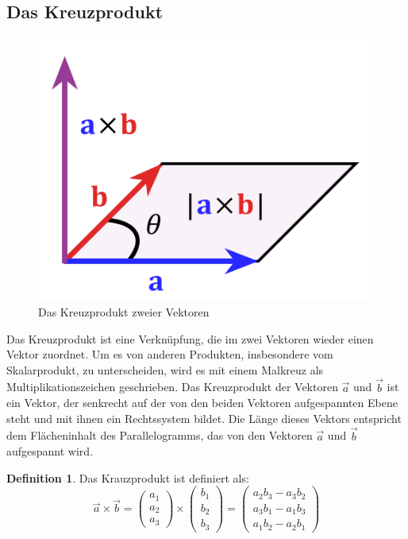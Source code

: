 \documentclass[a4paper,10pt,DIV9, BCOR12mm, oneside,openright,openbib]{scrreprt}
\theoremstyle{definition}
\newtheorem{mydef}{Definition}[section]
\theoremstyle{plain}
\begin{document}
\newpage
\subsection{Das Kreuzprodukt}\label{subsec:Kreuzprd}
\begin{figure}
 \centering
 \includegraphics[scale=0.4,keepaspectratio=true]{./Bilder/480px-Cross_product_parallelogram.png}
 \caption{Das Kreuzprodukt zweier Vektoren}
 \label{fig:Kreuzprd}
\end{figure}

Das Kreuzprodukt ist eine Verknüpfung, die im zwei Vektoren wieder einen Vektor zuordnet. Um es von anderen Produkten, insbesondere vom Skalarprodukt, zu unterscheiden, wird es mit einem Malkreuz als Multiplikationszeichen geschrieben.
Das Kreuzprodukt der Vektoren $\vec a$ und $\vec b$ ist ein Vektor, der senkrecht auf der von den beiden Vektoren aufgespannten Ebene steht und mit ihnen ein Rechtssystem bildet. Die Länge dieses Vektors entspricht dem Flächeninhalt des Parallelogramms, das von den Vektoren $\vec a$ und $\vec b$ aufgespannt wird.
\begin{mydef}
 Das Krauzprodukt ist definiert als:
    \[\vec{a}\times\vec{b} = \begin{pmatrix}a_1 \\ a_2 \\ a_3\end{pmatrix} \times \begin{pmatrix}b_1 \\ b_2 \\ b_3 \end{pmatrix} = \begin{pmatrix} a_2b_3 - a_3b_2 \\ a_3b_1 - a_1b_3 \\ a_1b_2 - a_2b_1 \end{pmatrix} \]
\end{mydef}
\end{document}
